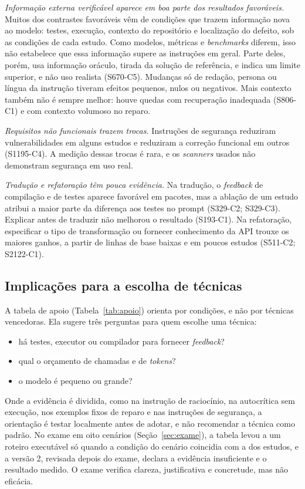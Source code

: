 \textit{Informação externa verificável aparece em boa parte dos resultados favoráveis.} Muitos dos contrastes
favoráveis vêm de condições que trazem informação nova ao modelo: testes, execução, contexto do repositório e
localização do defeito, sob as condições de cada estudo. Como modelos, métricas e \textit{benchmarks} diferem, isso
não estabelece que essa informação supere as instruções em geral. Parte deles, porém, usa informação oráculo, tirada da solução de referência, e indica um limite
superior, e não uso realista (S670-C5).
Mudanças só de redação, persona ou língua da instrução tiveram efeitos pequenos, nulos ou negativos. Mais
contexto também não é sempre melhor: houve quedas com recuperação inadequada (S806-C1) e com contexto volumoso
no reparo.

\textit{Requisitos não funcionais trazem trocas.} Instruções de segurança reduziram vulnerabilidades em alguns
estudos e reduziram a correção funcional em outros (S1195-C4). A medição dessas trocas é rara, e os
\textit{scanners} usados não demonstram segurança em uso real.

\textit{Tradução e refatoração têm pouca evidência.} Na tradução, o \textit{feedback} de compilação e de testes
aparece favorável em pacotes, mas a ablação de um estudo atribui a maior parte da diferença aos testes no prompt
(S329-C2; S329-C3).
Explicar antes de traduzir não melhorou o resultado (S193-C1).
Na refatoração, especificar o tipo de transformação ou fornecer conhecimento da API trouxe os maiores ganhos, a partir de linhas de base baixas e em poucos estudos (S511-C2; S2122-C1).

\subsection{Implicações para a escolha de técnicas}
A tabela de apoio (Tabela~\ref{tab:apoio}) orienta por condições, e não por técnicas vencedoras. Ela sugere três
perguntas para quem escolhe uma técnica:
\begin{itemize}
  \item há testes, executor ou compilador para fornecer \textit{feedback}?
  \item qual o orçamento de chamadas e de \textit{tokens}?
  \item o modelo é pequeno ou grande?
\end{itemize}
Onde a evidência é dividida, como na instrução de raciocínio, na autocrítica sem execução, nos exemplos fixos de
reparo e nas instruções de segurança, a orientação é testar localmente antes de adotar, e não recomendar a técnica
como padrão. No exame em oito cenários (Seção~\ref{sec:exame}), a tabela levou
a um roteiro executável só quando a condição do cenário coincidia com a dos estudos, e a versão 2,
revisada depois do exame, declara a evidência insuficiente e o resultado medido. O exame verifica clareza, justificativa e concretude,
mas não eficácia.

